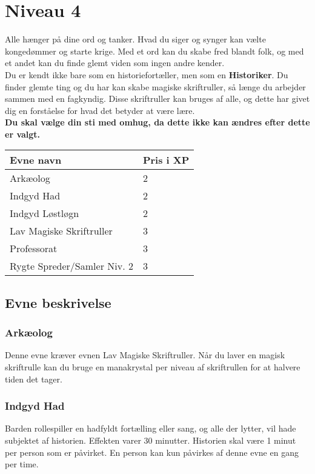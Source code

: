 \chapter{Niveau 4}
Alle hænger på dine ord og tanker. Hvad du siger og synger kan vælte kongedømmer og starte krige. Med et ord kan du skabe fred blandt folk, og med et andet kan du finde glemt viden som ingen andre kender.\\
Du er kendt ikke bare som en historiefortæller, men som en \textbf{Historiker}. Du finder glemte ting og du har kan skabe magiske skriftruller, så længe du arbejder sammen med en fagkyndig. Disse skriftruller kan bruges af alle, og dette har givet dig en forståelse for hvad det betyder at være lære.\\

\textbf{Du skal vælge din sti med omhug, da dette ikke kan ændres efter dette er valgt.}\\


\begin{table}[H]
    \centering
    \begin{tabular}{|p{}|p{}|}
    \rowcolor{cerulean!80}\hline
        Evne navn & Pris i XP \\\hline
        Arkæolog & 2 \\\hline
        Indgyd Had& 2 \\\hline
        Indgyd Løstløgn& 2 \\\hline
        Lav Magiske Skriftruller & 3 \\\hline
        Professorat & 3 \\\hline
        Rygte Spreder/Samler Niv. 2 & 3\\\hline
    \end{tabular}
\end{table}

\section{Evne beskrivelse}

\subsection{Arkæolog}
Denne evne kræver evnen Lav Magiske Skriftruller. Når du laver en magisk skriftrulle kan du bruge en manakrystal per niveau af skriftrullen for at halvere tiden det tager. 

\subsection{Indgyd Had}
Barden rollespiller en hadfyldt fortælling eller sang, og alle der lytter, vil hade subjektet af historien. Effekten varer 30 minutter. Historien skal være 1 minut per person som er påvirket. En person kan kun påvirkes af denne evne en gang per time.

